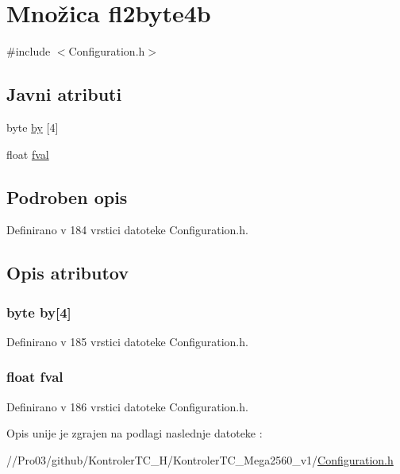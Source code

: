 \hypertarget{unionfl2byte4b}{}\section{ Množica fl2byte4b}
\label{unionfl2byte4b}


{\ttfamily \#include $<$Configuration.\+h$>$}

\subsection*{Javni atributi}
\begin{DoxyCompactItemize}
\item 
byte \hyperlink{unionfl2byte4b_a3ac70c71a12988f6a0733cd4a585a5e8}{by} \mbox{[}4\mbox{]}
\item 
float \hyperlink{unionfl2byte4b_a89560ba498e3fe528d97a435d5f61054}{fval}
\end{DoxyCompactItemize}


\subsection{Podroben opis}


Definirano v 184 vrstici datoteke Configuration.\+h.



\subsection{Opis atributov}
\hypertarget{unionfl2byte4b_a3ac70c71a12988f6a0733cd4a585a5e8}{}
\subsubsection[{by}]{\setlength{\rightskip}{0pt plus 5cm}byte by\mbox{[}4\mbox{]}}\label{unionfl2byte4b_a3ac70c71a12988f6a0733cd4a585a5e8}


Definirano v 185 vrstici datoteke Configuration.\+h.

\hypertarget{unionfl2byte4b_a89560ba498e3fe528d97a435d5f61054}{}
\subsubsection[{fval}]{\setlength{\rightskip}{0pt plus 5cm}float fval}\label{unionfl2byte4b_a89560ba498e3fe528d97a435d5f61054}


Definirano v 186 vrstici datoteke Configuration.\+h.



Opis unije je zgrajen na podlagi naslednje datoteke \+:\begin{DoxyCompactItemize}
\item 
//\+Pro03/github/\+Kontroler\+T\+C\+\_\+\+H/\+Kontroler\+T\+C\+\_\+\+Mega2560\+\_\+v1/\hyperlink{_configuration_8h}{Configuration.\+h}\end{DoxyCompactItemize}
